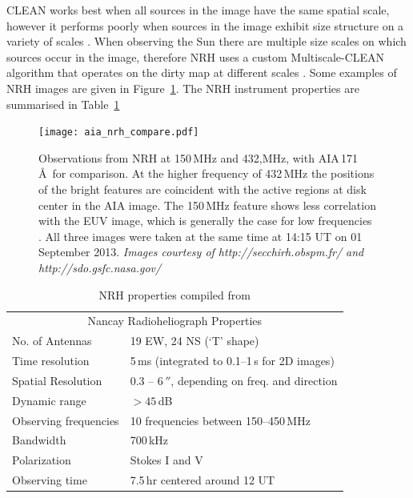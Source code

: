 CLEAN works best when all sources in the image have the same spatial scale, however it performs poorly when sources in the image exhibit size structure on a variety of scales \citep{wakker1998}. When observing the Sun there are multiple size scales on which sources occur in the image, therefore NRH uses a custom Multiscale-CLEAN algorithm that operates on the dirty map at different scales \citep{mercier2006}. Some examples of NRH images are given in Figure~\ref{fig:nrh_obs}. The NRH instrument properties are summarised in Table~\ref{tab:nrh}


\begin{figure}[!t]
\begin{center}
\texttt{[image: aia\_nrh\_compare.pdf]}
\caption[NRH observations]{Observations from NRH at 150\,MHz and 432,MHz, with AIA\,171\,\AA~for comparison. {\color{blue}At the higher frequency of 432\,MHz the positions of the bright features are coincident with the active regions at disk center in the AIA image. The 150\,MHz feature shows less correlation with the EUV image, which is generally the case for low frequencies \citep{mercier2009}.} All three images were taken at the same time at 14:15 UT on 01 September 2013. \emph{Images courtesy of http://secchirh.obspm.fr/ and http://sdo.gsfc.nasa.gov/}}
\label{fig:nrh_obs}
\end{center}
\end{figure}
\begin{table}[!t]
  \centering
\begin{tabular}{ll}
\hline
\multicolumn{2}{c}{Nancay Radioheliograph Properties} \\
\cline{1-2}
No. of Antennas		 & 19 EW, 24 NS (`T' shape) \\
Time resolution            & 5\,ms (integrated to 0.1--1\,s for 2D images) \\
Spatial Resolution        & 0.3 -- 6\,$''$, depending on freq. and direction \\
Dynamic range   		  & $>45$\,dB \\
Observing frequencies & 10 frequencies between 150--450\,MHz \\
Bandwidth                    & 700\,kHz \\
Polarization                  & Stokes I and V \\
Observing time             & 7.5\,hr centered around 12 UT \\
\hline

\end{tabular}
\caption {NRH properties compiled from \citep{kerdraon1997}}
\label{tab:nrh}
\end{table}

